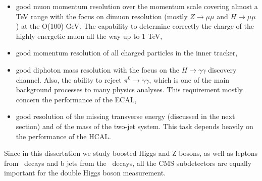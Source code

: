 \begin{normalsize}
\begin{itemize}
\item good muon momentum resolution over the momentum scale covering almost a TeV range with the focus on dimuon resolution (mostly $Z \rightarrow \mu \mu$ and $H \rightarrow \mu \mu$) at the O(100) GeV. The capability to determine correctly the charge of the highly energetic muon all the way up to 1 TeV,
\item good momentum resolution of all charged particles in the inner tracker,
\item good diphoton mass resolution with the focus on the $H \rightarrow \gamma \gamma$ discovery channel. Also, the ability to reject $\pi^0 \rightarrow \gamma \gamma$, which is one of the main background processes to many physics analyses.  This requirement mostly concern the performance of the ECAL,
\item good resolution of the missing transverse energy (discussed in the next section) and of the mass of the two-jet system. This task depends heavily on the performance of the HCAL.
\end{itemize}

Since in this dissertation we study boosted Higgs and Z bosons, as well as leptons from \Zll~decays and b jets from the \HBB~decays, all the CMS subdetectors are equally important for the double Higgs boson measurement.



\end{normalsize}       %
 
